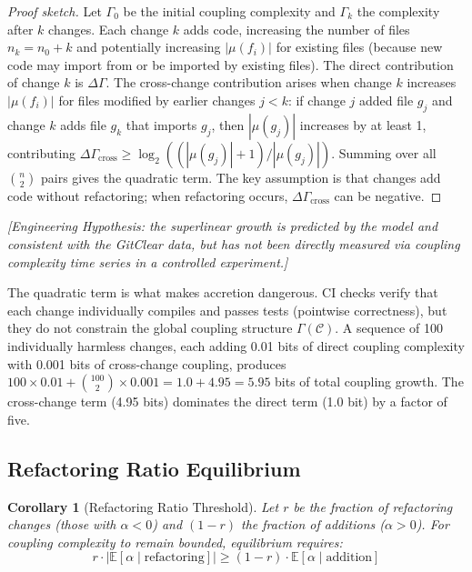 \documentclass[11pt, a4paper, logo, copyright]{googledeepmind}
\newtheorem{corollary}{Corollary}[section]
\newcommand{\E}{\mathbb{E}}
\begin{document}
\begin{proof}[Proof sketch]
Let $\Gamma_0$ be the initial coupling complexity and $\Gamma_k$ the complexity after $k$ changes. Each change $k$ adds code, increasing the number of files $n_k = n_0 + k$ and potentially increasing $|\mu(f_i)|$ for existing files (because new code may import from or be imported by existing files). The direct contribution of change $k$ is $\Delta \Gamma$. The cross-change contribution arises when change $k$ increases $|\mu(f_i)|$ for files modified by earlier changes $j < k$: if change $j$ added file $g_j$ and change $k$ adds file $g_k$ that imports $g_j$, then $|\mu(g_j)|$ increases by at least 1, contributing $\Delta \Gamma_{\text{cross}} \geq \log_2((|\mu(g_j)|+1)/|\mu(g_j)|)$. Summing over all $\binom{n}{2}$ pairs gives the quadratic term. The key assumption is that changes add code without refactoring; when refactoring occurs, $\Delta \Gamma_{\text{cross}}$ can be negative.
\end{proof}

\emph{[Engineering Hypothesis: the superlinear growth is predicted by the model and consistent with the GitClear data, but has not been directly measured via coupling complexity time series in a controlled experiment.]}

The quadratic term is what makes accretion dangerous. CI checks verify that each change individually compiles and passes tests (pointwise correctness), but they do not constrain the global coupling structure $\Gamma(\mathcal{C})$. A sequence of 100 individually harmless changes, each adding 0.01 bits of direct coupling complexity with 0.001 bits of cross-change coupling, produces $100 \times 0.01 + \binom{100}{2} \times 0.001 = 1.0 + 4.95 = 5.95$ bits of total coupling growth. The cross-change term (4.95 bits) dominates the direct term (1.0 bit) by a factor of five.

\subsection{Refactoring Ratio Equilibrium}

\begin{corollary}[Refactoring Ratio Threshold]
\label{cor:refactoring}
Let $r$ be the fraction of refactoring changes (those with $\alpha < 0$) and $(1-r)$ the fraction of additions ($\alpha > 0$). For coupling complexity to remain bounded, equilibrium requires:
\begin{equation}
r \cdot |\E[\alpha \mid \text{refactoring}]| \geq (1-r) \cdot \E[\alpha \mid \text{addition}]
\end{equation}
\end{corollary}
\end{document}
